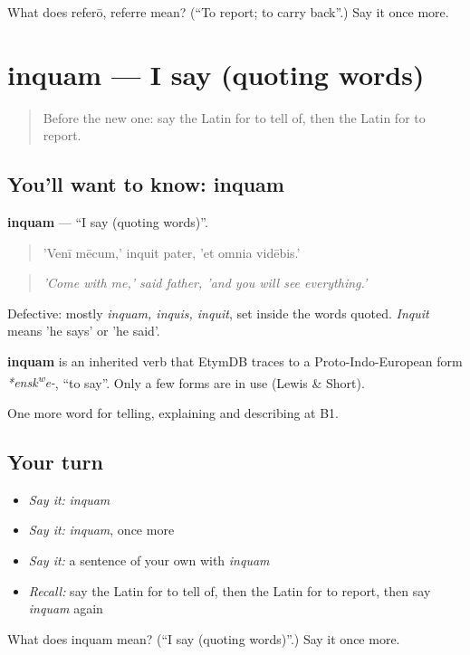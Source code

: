 \begin{tcolorbox}[breakable,colback=teal!4,colframe=teal!35!black,title={Before you move on}]
What does referō, referre mean? (\textquotedblleft{}To report; to carry back\textquotedblright{}.) Say it once more.
\end{tcolorbox}
\section[inquam]{inquam — I say (quoting words)}

\label{lesson:LA-C299-inquam}



\begin{quote}
Before the new one: say the Latin for to tell of, then the Latin for to report.
\end{quote}

\subsection*{You'll want to know: inquam}
\textbf{inquam} — \textquotedblleft{}I say (quoting words)\textquotedblright{}.

\begin{quote}
'Venī mēcum,' inquit pater, 'et omnia vidēbis.'
\end{quote}

\begin{quote}
\emph{'Come with me,' said father, 'and you will see everything.'}
\end{quote}

Defective: mostly \emph{inquam, inquis, inquit}, set inside the words quoted. \emph{Inquit} means 'he says' or 'he said'.

\begin{cousinweb}
\textbf{inquam} is an inherited verb that EtymDB traces to a Proto-Indo-European form \emph{*ensk\textsuperscript{w}e-}, \textquotedblleft{}to say\textquotedblright{}. Only a few forms are in use (Lewis \& Short).
\end{cousinweb}

\begin{grammarlens}[title={What you've built}]
One more word for telling, explaining and describing at B1.
\end{grammarlens}

\subsection*{Your turn}
\begin{itemize}
\raggedright
  \item \emph{Say it:} \emph{inquam}
  \item \emph{Say it:} \emph{inquam}, once more
  \item \emph{Say it:} a sentence of your own with \emph{inquam}
  \item \emph{Recall:} say the Latin for to tell of, then the Latin for to report, then say \emph{inquam} again
\end{itemize}

\begin{tcolorbox}[breakable,colback=teal!4,colframe=teal!35!black,title={Before you move on}]
What does inquam mean? (\textquotedblleft{}I say (quoting words)\textquotedblright{}.) Say it once more.
\end{tcolorbox}

